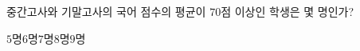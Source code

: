 중간고사와 기말고사의 국어 점수의 평균이 $70$점 이상인 학생은 몇 명인가?
\begin{choices32}{$5$명}{$6$명}{$7$명}{$8$명}{$9$명}\end{choices32}
